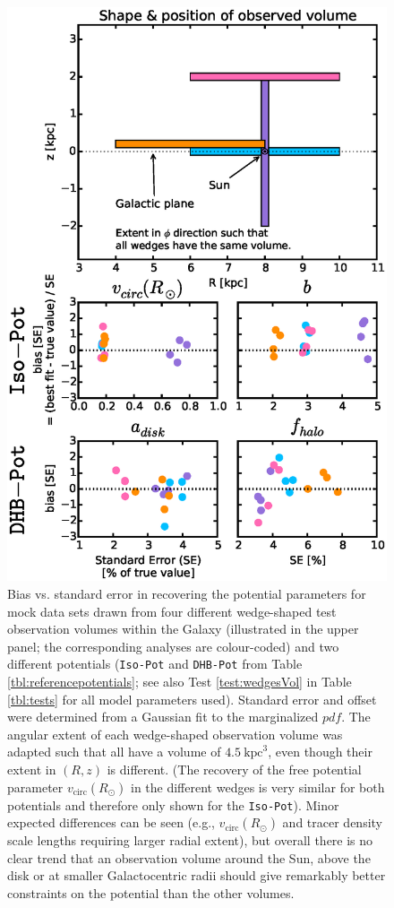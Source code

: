 \documentclass[iop,revtex4,numberedappendix,appendixfloats]{emulateapj}
\newcommand{\pdf}{\ensuremath{pdf}}
\begin{document}
\begin{figure}[!htbp]
\centering
\includegraphics[width=\columnwidth]{wedgesVol_bias_vs_SE.eps}
\caption{Bias vs. standard error in recovering the potential parameters for mock data sets drawn from four different wedge-shaped test observation volumes within the Galaxy (illustrated in the upper panel; the corresponding analyses are colour-coded) and two different potentials (\texttt{Iso-Pot} and \texttt{DHB-Pot} from Table \ref{tbl:referencepotentials}; see also Test \ref{test:wedgesVol} in Table \ref{tbl:tests} for all model parameters used). Standard error and offset were determined from a Gaussian fit to the marginalized \pdf{}. The angular extent of each wedge-shaped observation volume was adapted such that all have a volume of $4.5~\text{kpc}^3$, even though their extent in $(R,z)$ is different. (The recovery of the free potential parameter $v_\text{circ}(R_\odot)$ in the different wedges is very similar for both potentials and therefore only shown for the \texttt{Iso-Pot}). Minor expected differences can be seen (e.g., $v_\text{circ}(R_\odot)$ and tracer density scale lengths requiring larger radial extent), but overall there is no clear trend that an observation volume around the Sun, above the disk or at smaller Galactocentric radii should give remarkably better constraints on the potential than the other volumes.}
\label{fig:wedgesVol_bias_vs_SE}
\end{figure}
\end{document}
